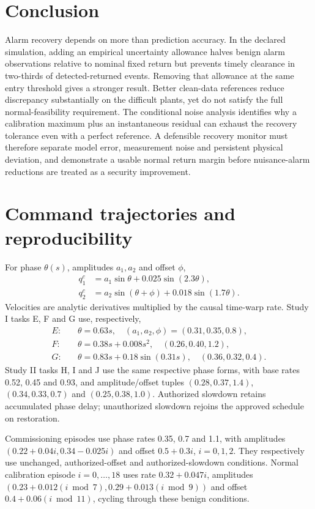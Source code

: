 \documentclass[11pt]{article}
\begin{document}
\section{Conclusion}
Alarm recovery depends on more than prediction accuracy. In the declared simulation, adding an empirical uncertainty allowance halves benign alarm observations relative to nominal fixed return but prevents timely clearance in two-thirds of detected-returned events. Removing that allowance at the same entry threshold gives a stronger result. Better clean-data references reduce discrepancy substantially on the difficult plants, yet do not satisfy the full normal-feasibility requirement. The conditional noise analysis identifies why a calibration maximum plus an instantaneous residual can exhaust the recovery tolerance even with a perfect reference. A defensible recovery monitor must therefore separate model error, measurement noise and persistent physical deviation, and demonstrate a usable normal return margin before nuisance-alarm reductions are treated as a security improvement.

\clearpage
\appendix
\section{Command trajectories and reproducibility}
For phase $\theta(s)$, amplitudes $a_1,a_2$ and offset $\phi$,
\begin{align}
 q_1^c&=a_1\sin\theta+0.025\sin(2.3\theta),\\
 q_2^c&=a_2\sin(\theta+\phi)+0.018\sin(1.7\theta).
\end{align}
Velocities are analytic derivatives multiplied by the causal time-warp rate. Study I tasks E, F and G use, respectively,
\begin{align*}
 E:&\quad \theta=0.63s,\quad (a_1,a_2,\phi)=(0.31,0.35,0.8),\\
 F:&\quad \theta=0.38s+0.008s^2,\quad (0.26,0.40,1.2),\\
 G:&\quad \theta=0.83s+0.18\sin(0.31s),\quad (0.36,0.32,0.4).
\end{align*}
Study II tasks H, I and J use the same respective phase forms, with base rates 0.52, 0.45 and 0.93, and amplitude/offset tuples $(0.28,0.37,1.4)$, $(0.34,0.33,0.7)$ and $(0.25,0.38,1.0)$. Authorized slowdown retains accumulated phase delay; unauthorized slowdown rejoins the approved schedule on restoration.

Commissioning episodes use phase rates 0.35, 0.7 and 1.1, with amplitudes $(0.22+0.04i,0.34-0.025i)$ and offset $0.5+0.3i$, $i=0,1,2$. They respectively use unchanged, authorized-offset and authorized-slowdown conditions. Normal calibration episode $i=0,\ldots,18$ uses rate $0.32+0.047i$, amplitudes $(0.23+0.012(i\bmod7),0.29+0.013(i\bmod9))$ and offset $0.4+0.06(i\bmod11)$, cycling through these benign conditions.
\end{document}
